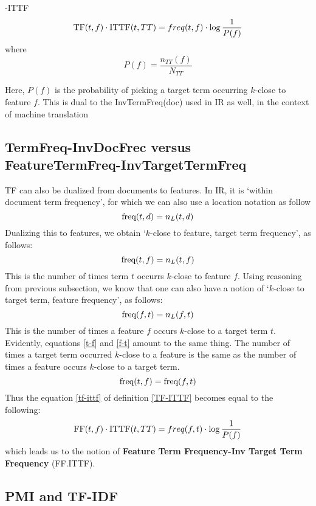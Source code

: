 \begin{definition}
\label{TF-ITTF}
\TF-\textmd{ITTF}
\begin{equation}
\label{tf-ittf}
\textmd{TF}(t,f) \cdot \textmd{ITTF}(t, TT) = freq(t, f) \cdot \log{\frac{1}{P(f)}}
\end{equation}
where
\[
P(f) =  \frac{n_{TT}(f)}{N_{TT}}
\]
\end{definition}
Here, $P(f)$ is the  probability of picking a target term  occurring $k$-close to feature $f$.  This is dual to the InvTermFreq(doc)
used in IR as well, in the context of machine translation



\subsection{TermFreq-InvDocFrec versus FeatureTermFreq-InvTargetTermFreq}

TF can also be dualized from documents to features. In IR, it is `within document term frequency', for which we can also use a location notation as follow
\[
\textmd{freq}(t,d) = n_L(t,d)
\]
Dualizing this to features, we obtain `$k$-close to feature, target  term frequency', as follows:
\begin{equation}
\label{t-f}
\textmd{freq}(t,f) = n_L(t,f)
\end{equation}
This is the number of times term $t$ occurrs $k$-close to feature $f$.  Using reasoning from previous subsection, we know that one can also have a notion of `$k$-close to target term, feature frequency', as follows:
\begin{equation}
\label{f-t}
\textmd{freq}(f,t) = n_L(f,t)
\end{equation}
This is the number of times a feature $f$ occurs $k$-close to a target term $t$.  Evidently, equations \ref{t-f} and \ref{f-t} amount to the same thing. The number of times a target term occurred $k$-close to a feature is the same as the number of times a feature occurs $k$-close to a target term. 
\[
\textmd{freq}(t,f) = \textmd{freq}(f,t) 
\]
Thus the equation \ref{tf-ittf} of definition \ref{TF-ITTF} becomes equal to the following: 
\begin{equation}
\label{ff-ittf}
\textmd{FF}(t,f) \cdot \textmd{ITTF}(t, TT) =  freq(f, t) \cdot \log{\frac{1}{P(f)}}
\end{equation}
which leads us to  the notion of  {\bf Feature Term Frequency-Inv Target Term Frequency} (FF.ITTF).

\subsection{PMI and TF-IDF}

